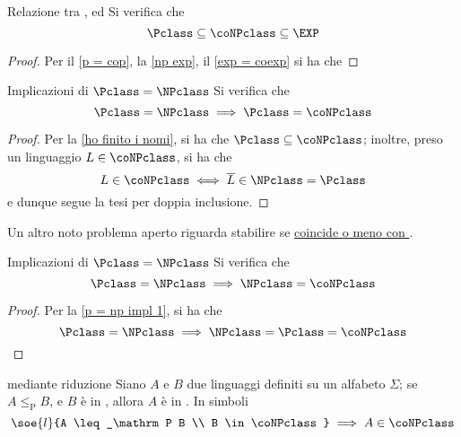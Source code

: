 \documentclass[a4paper, 12pt]{report}
\begin{document}
    \begin{framedprop}[label={ho finito i nomi}]{Relazione tra \Pclass, \coNPclass ed \EXP}
        Si verifica che $$\Pclass \subseteq \coNPclass \subseteq \EXP$$
    \end{framedprop}

    \begin{proof}
        Per il \cref{p = cop}, la \cref{np exp}, il \cref{exp = coexp} si ha che 
    \end{proof}

    \begin{framedprop}[label={p = np impl 1}]{Implicazioni di $\Pclass = \NPclass$}
        Si verifica che $$\Pclass = \NPclass \implies \Pclass = \coNPclass$$
    \end{framedprop}

    \begin{proof}
        Per la \cref{ho finito i nomi}, si ha che $\Pclass \subseteq \coNPclass$; inoltre, preso un linguaggio $L \in \coNPclass$, si ha che $$L \in \coNPclass \iff \overline L \in \NPclass = \Pclass$$ e dunque segue la tesi per doppia inclusione.
    \end{proof}

    \begin{framedobs}{}
        Un altro noto problema aperto riguarda stabilire se \href{https://en.wikipedia.org/wiki/Co-NP}{\NPclass coincide o meno con \coNPclass}.
    \end{framedobs}

    \begin{framedcor}[label={p = np impl 2}]{Implicazioni di $\Pclass = \NPclass$}
        Si verifica che $$\Pclass = \NPclass \implies \NPclass = \coNPclass$$
    \end{framedcor}

    \begin{proof}
        Per la \cref{p = np impl 1}, si ha che $$\Pclass = \NPclass \implies \NPclass = \Pclass = \coNPclass$$
    \end{proof}

    \begin{framedthm}[label={conp w red}]{\coNPclass mediante riduzione}
        Siano $A$ e $B$ due linguaggi definiti su un alfabeto $\Sigma$; se $A \leq_\mathrm P B$, e $B$ è in \coNPclass, allora $A$ è in \coNPclass. In simboli $$\soe{l}{A \leq_\mathrm P B \\ B \in \coNPclass} \implies A \in \coNPclass$$
    \end{framedthm}
\end{document}
